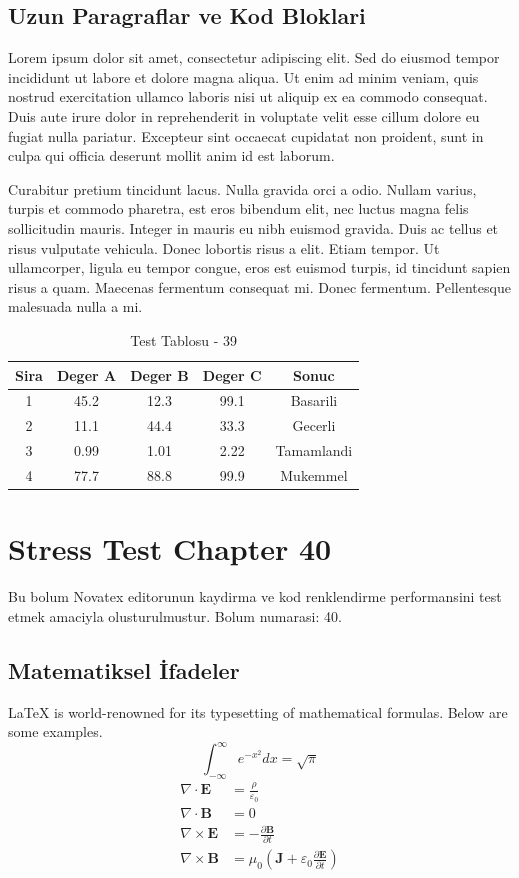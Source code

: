 \documentclass[12pt,a4paper]{article}
\begin{document}
\subsection{Uzun Paragraflar ve Kod Bloklari}
Lorem ipsum dolor sit amet, consectetur adipiscing elit. Sed do eiusmod tempor incididunt ut labore et dolore magna aliqua. Ut enim ad minim veniam, quis nostrud exercitation ullamco laboris nisi ut aliquip ex ea commodo consequat. Duis aute irure dolor in reprehenderit in voluptate velit esse cillum dolore eu fugiat nulla pariatur. Excepteur sint occaecat cupidatat non proident, sunt in culpa qui officia deserunt mollit anim id est laborum.

Curabitur pretium tincidunt lacus. Nulla gravida orci a odio. Nullam varius, turpis et commodo pharetra, est eros bibendum elit, nec luctus magna felis sollicitudin mauris. Integer in mauris eu nibh euismod gravida. Duis ac tellus et risus vulputate vehicula. Donec lobortis risus a elit. Etiam tempor. Ut ullamcorper, ligula eu tempor congue, eros est euismod turpis, id tincidunt sapien risus a quam. Maecenas fermentum consequat mi. Donec fermentum. Pellentesque malesuada nulla a mi.

\begin{table}[h!]
\centering
\begin{tabular}{|c|c|c|c|c|}
\hline
\textbf{Sira} & \textbf{Deger A} & \textbf{Deger B} & \textbf{Deger C} & \textbf{Sonuc} \\
\hline
1 & 45.2 & 12.3 & 99.1 & Basarili \\
2 & 11.1 & 44.4 & 33.3 & Gecerli \\
3 & 0.99 & 1.01 & 2.22 & Tamamlandi \\
4 & 77.7 & 88.8 & 99.9 & Mukemmel \\
\hline
\end{tabular}
\caption{Test Tablosu - 39}
\end{table}

\newpage
\section{Stress Test Chapter 40}
Bu bolum Novatex editorunun kaydirma ve kod renklendirme performansini test etmek amaciyla olusturulmustur. Bolum numarasi: 40.

\subsection{Matematiksel İfadeler}
\LaTeX{} is world-renowned for its typesetting of mathematical formulas. Below are some examples.
\begin{equation}
\int_{-\infty}^{\infty} e^{-x^2} dx = \sqrt{\pi}
\end{equation}
\begin{align}
\nabla \cdot \mathbf{E} &= \frac{\rho}{\varepsilon_0} \\
\nabla \cdot \mathbf{B} &= 0 \\
\nabla \times \mathbf{E} &= -\frac{\partial \mathbf{B}}{\partial t} \\
\nabla \times \mathbf{B} &= \mu_0\left(\mathbf{J} + \varepsilon_0 \frac{\partial \mathbf{E}}{\partial t}\right)
\end{align}
\end{document}
